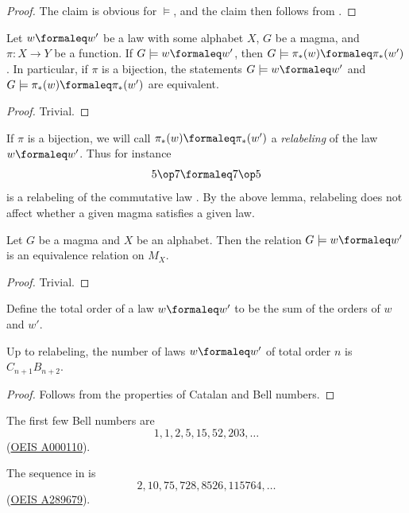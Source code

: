 \begin{proof}
  The claim is obvious for $\models$, and the claim then follows from .
\end{proof}

\begin{lemma}[Pushforward]\label{push}
  Let $w \formaleq w'$ be a law with some alphabet $X$, $G$ be a magma, and $\pi: X \to Y$ be a function.
  If $G \models w \formaleq w'$, then $G \models \pi_*(w) \formaleq \pi_*(w')$.
  In particular, if $\pi$ is a bijection, the statements $G \models w \formaleq w'$ and $G \models \pi_*(w) \formaleq \pi_*(w')$ are equivalent.
\end{lemma}

\begin{proof}
  Trivial.
\end{proof}

If $\pi$ is a bijection, we will call $\pi_*(w) \formaleq \pi_*(w')$ a \emph{relabeling} of the law $w \formaleq w'$. Thus for instance
$$ 5 \op 7 \formaleq 7 \op 5$$
is a relabeling of the commutative law . By the above lemma, relabeling does not affect whether a given magma satisfies a given law.

\begin{lemma}[Equivalence]\label{equiv}
  Let $G$ be a magma and $X$ be an alphabet.
  Then the relation $G \models w \formaleq w'$ is an equivalence relation on $M_X$.
\end{lemma}

\begin{proof}
  Trivial.
\end{proof}

Define the total order of a law $w \formaleq w'$ to be the sum of the orders of $w$ and $w'$.

\begin{lemma}\label{law-count}
  Up to relabeling, the number of laws $w \formaleq w'$ of total order $n$ is $C_{n+1} B_{n+2}$.
\end{lemma}

\begin{proof}
  Follows from the properties of Catalan and Bell numbers.
\end{proof}

The first few Bell numbers are
$$ 1, 1, 2, 5, 15, 52, 203, \dots$$
(\href{https://oeis.org/A000110}{OEIS A000110}).

The sequence in  is
$$ 2, 10, 75, 728, 8526, 115764, \dots$$
(\href{https://oeis.org/A289679}{OEIS A289679}).

